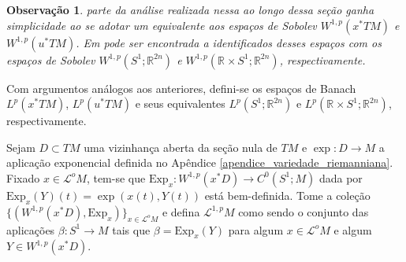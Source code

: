 \documentclass[12pt]{book}
\newtheorem{observacao}[teorema]{Observação}
\newcommand{\caminhosexponenciaisSobolev}{\mathcal{L}^{1,p}M}
\newcommand{\circulo}{S^{1}}
\newcommand{\espacoLp}[1]{L^{p}(#1)}
\newcommand{\espacoLpcontradominio}[2]{L^{p}(#1;#2)}
\newcommand{\espacosobolev}[1]{W^{1,p}(#1)}
\newcommand{\espacosobolevcontradominio}[2]{W^{1,p}(#1;#2)}
\newcommand{\Exp}{\text{Exp}}
\newcommand{\pullbackfibradotangente}[2]{#1^{*}T#2}
\newcommand{\pullbackfibradotangenteM}[1]{\pullbackfibradotangente{#1}{M}}
\newcommand{\retacartesianocirculo}{\real{} \times \circulo}
\newcommand{\real}[1]{\mathbb{R}^{#1}}
\newcommand{\lacocontrateis}{\mathcal{L}^{o}M}
\begin{document}
	\begin{observacao}
		parte da análise realizada nessa ao longo dessa seção ganha simplicidade ao se adotar um equivalente aos espaços de Sobolev $\espacosobolev{\pullbackfibradotangenteM{x}}$ e $\espacosobolev{\pullbackfibradotangenteM{u}}$. Em \cite{audi_floer_homology} pode ser encontrada a identificados desses espaços com os espaços de Sobolev $\espacosobolevcontradominio{\circulo}{\real{2n}}$ e $\espacosobolevcontradominio{\retacartesianocirculo}{\real{2n}}$, respectivamente.
	\end{observacao}
	
	Com argumentos análogos aos anteriores, defini-se os espaços de Banach $\espacoLp{\pullbackfibradotangenteM{x}}$, $\espacoLp{\pullbackfibradotangenteM{u}}$ e seus  equivalentes $\espacoLpcontradominio{\circulo}{\real{2n}}$ e $\espacoLpcontradominio{\retacartesianocirculo}{\real{2n}}$, respectivamente.
	
	Sejam $D \subset TM$ uma vizinhança aberta da seção nula de $TM$ e $\exp:D\to M$ a aplicação exponencial definida no Apêndice \ref{apendice_variedade_riemanniana}.
	Fixado $x\in \lacocontrateis$, tem-se que $\Exp_{x}: \espacosobolev{x^{*}D} \to C^{0}(\circulo;M)$ dada por $\Exp_{x}(Y)(t) = \exp(x(t),Y(t))$ está bem-definida.
	Tome a coleção $\{ (\espacosobolev{x^{*}D}, \Exp_{x}) \}_{x \in \lacocontrateis}$ e defina $\caminhosexponenciaisSobolev$ como sendo o conjunto das aplicações $\beta:\circulo\to M$ tais que $\beta=\Exp_{x}(Y)$ para algum $x\in \lacocontrateis$ e algum $Y \in \espacosobolev{x^{*}D}$.
	
\end{document}
